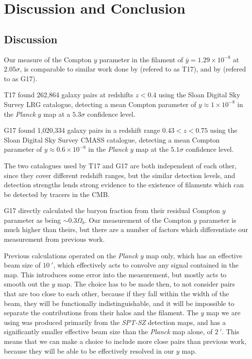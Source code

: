 \chapter{Discussion and Conclusion}

\section{Discussion}
Our measure of the Compton $y$ parameter in the filament of $\bar{y} = 1.29 \times 10^{-8}$ at $2.05 \sigma$, is comparable to similar work done by \cite{2019A&A...625A..67T} (refered to as T17), and by \cite{2019A&A...624A..48D} (refered to as G17).

\par T17 found 262,864 galaxy pairs at redshifts $z<0.4$ using the Sloan Digital Sky Survey LRG catalogue, detecting a mean Compton parameter of $y \approx 1 \times 10^{-8}$ in the \emph{Planck} $y$ map at a $5.3\sigma$ confidence level. 

\par G17 found 1,020,334 galaxy pairs in a redshift range $0.43 < z < 0.75$ using the Sloan Digital Sky Survey CMASS catalogue, detecting a mean Compton parameter of $y \approx 0.6 \times 10^{-8}$ in the \emph{Planck} $y$ map at the $5.1\sigma$ confidence level. 

\par The two catalogues used by T17 and G17 are both independent of each other, since they cover different redshift ranges, but the similar detection levels, and detection strengths lends strong evidence to the existence of filaments which can be detected by tracers in the CMB. 

\par G17 directly calculated the baryon fraction from their residual Compton $y$ parameter as being $\sim 0.3 \Omega_b$. Our measurement of the Compton $y$ parameter is much higher than theirs, but there are a number of factors which differentiate our measurement from previous work. 

\par Previous calculations operated on the \emph{Planck} $y$ map only, which has an effective beam size of $\SI{10}{\arcmin}$, which effectively acts to convolve any signal contained in the map. This introduces some error into the measurement, but mostly acts to smooth out the $y$ map. The choice has to be made then, to not consider pairs that are too close to each other, because if they fall within the width of the beam, they will be functionally indistinguishable, and it will be impossible to separate the contributions from their halos and the filament. The $y$ map we are using was produced primarily from the \emph{SPT-SZ} detection maps, and has a significantly smaller effective beam size than the \emph{Planck} map alone, of $\SI{2}{\arcmin}$. This means that we can make a choice to include more close pairs than previous work, because they will be able to be effectively resolved in our $y$ map. 

